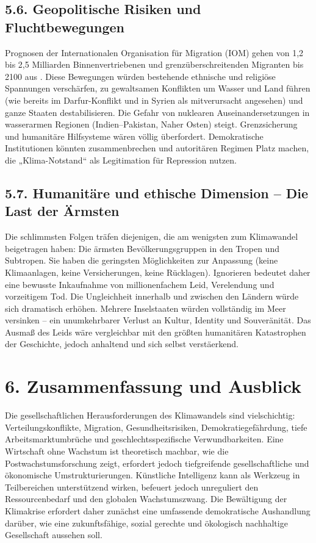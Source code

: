 \documentclass[12pt, a4paper]{article}
\begin{document}
	\subsection*{5.6. Geopolitische Risiken und Fluchtbewegungen}
	Prognosen der Internationalen Organisation für Migration (IOM) gehen von 1,2 bis 2,5 Milliarden Binnenvertriebenen und grenzüberschreitenden Migranten bis 2100 aus \cite{iom2025}.
	Diese Bewegungen würden bestehende ethnische und religiöse Spannungen verschärfen, zu gewaltsamen Konflikten um Wasser und Land führen (wie bereits im Darfur-Konflikt und in Syrien als mitverursacht angesehen) und ganze Staaten destabilisieren.
	Die Gefahr von nuklearen Auseinandersetzungen in wasserarmen Regionen (Indien–Pakistan, Naher Osten) steigt. Grenzsicherung und humanitäre Hilfsysteme wären völlig überfordert.
	Demokratische Institutionen könnten zusammenbrechen und autoritären Regimen Platz machen, die „Klima-Notstand“ als Legitimation für Repression nutzen.
	
	\subsection*{5.7. Humanitäre und ethische Dimension – Die Last der Ärmsten}
	Die schlimmsten Folgen träfen diejenigen, die am wenigsten zum Klimawandel beigetragen haben: Die ärmsten Bevölkerungsgruppen in den Tropen und Subtropen.
	Sie haben die geringsten Möglichkeiten zur Anpassung (keine Klimaanlagen, keine Versicherungen, keine Rücklagen).
	Ignorieren bedeutet daher eine bewusste Inkaufnahme von millionenfachem Leid, Verelendung und vorzeitigem Tod.
	Die Ungleichheit innerhalb und zwischen den Ländern würde sich dramatisch erhöhen.
	Mehrere Inselstaaten würden vollständig im Meer versinken – ein unumkehrbarer Verlust an Kultur, Identity und Souveränität.
	Das Ausmaß des Leids wäre vergleichbar mit den größten humanitären Katastrophen der Geschichte, jedoch anhaltend und sich selbst verstäerkend.
	
	\section*{6. Zusammenfassung und Ausblick}
	
	Die gesellschaftlichen Herausforderungen des Klimawandels sind vielschichtig: Verteilungskonflikte, Migration, Gesundheitsrisiken, Demokratiegefährdung, tiefe Arbeitsmarktumbrüche und geschlechtsspezifische Verwundbarkeiten.
	Eine Wirtschaft ohne Wachstum ist theoretisch machbar, wie die Postwachstumsforschung zeigt, erfordert jedoch tiefgreifende gesellschaftliche und ökonomische Umstrukturierungen.
	Künstliche Intelligenz kann als Werkzeug in Teilbereichen unterstützend wirken, befeuert jedoch unreguliert den Ressourcenbedarf und den globalen Wachstumszwang.
	Die Bewältigung der Klimakrise erfordert daher zunächst eine umfassende demokratische Aushandlung darüber, wie eine zukunftsfähige, sozial gerechte und ökologisch nachhaltige Gesellschaft aussehen soll.
	
\end{document}
